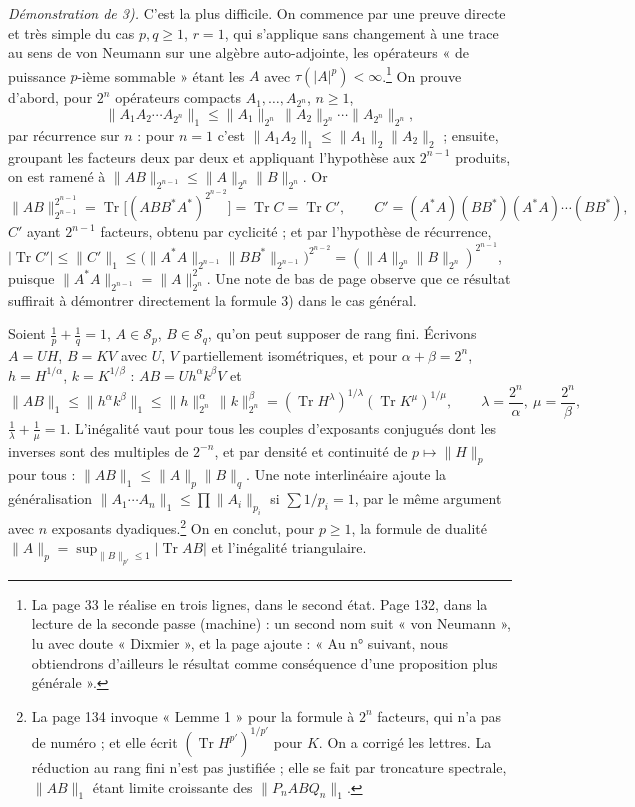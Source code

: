 \documentclass[11pt,a4paper]{article}
\begin{document}
\emph{Démonstration de 3).} C'est la plus difficile. On commence par une
preuve directe et très simple du cas $p, q \geq 1$, $r = 1$, qui
s'applique sans changement à une trace au sens de von Neumann sur une
algèbre auto-adjointe, les opérateurs « de puissance $p$-ième sommable »
étant les $A$ avec $\tau(|A|^p) < \infty$.\footnote{La page 33 le
réalise en trois lignes, dans le second état. Page 132, dans la lecture de
la seconde passe (machine) : un second nom suit « von Neumann », lu avec
doute « Dixmier », et la page ajoute : « Au n° suivant, nous obtiendrons
d'ailleurs le résultat comme conséquence d'une proposition plus
générale ».} On prouve d'abord, pour
$2^n$ opérateurs compacts $A_1, \ldots, A_{2^n}$, $n \geq 1$,
\[
  \|A_1 A_2 \cdots A_{2^n}\|_1 \leq \|A_1\|_{2^n}\,\|A_2\|_{2^n} \cdots \|A_{2^n}\|_{2^n},
\]
par récurrence sur $n$ : pour $n = 1$ c'est $\|A_1A_2\|_1 \leq
\|A_1\|_2\|A_2\|_2$ ; ensuite, groupant les facteurs deux par deux et
appliquant l'hypothèse aux $2^{n-1}$ produits, on est ramené à $\|AB\|_{2^{n-1}}
\leq \|A\|_{2^n}\|B\|_{2^n}$. Or
\[
  \|AB\|_{2^{n-1}}^{2^{n-1}} = \operatorname{Tr}\bigl[(ABB^{*}A^{*})^{2^{n-2}}\bigr]
  = \operatorname{Tr} C = \operatorname{Tr} C', \qquad
  C' = (A^{*}A)(BB^{*})(A^{*}A)\cdots(BB^{*}),
\]
$C'$ ayant $2^{n-1}$ facteurs, obtenu par cyclicité ; et par l'hypothèse
de récurrence, $|\operatorname{Tr} C'| \leq \|C'\|_1 \leq \bigl(\|A^{*}A\|_{2^{n-1}}
\|BB^{*}\|_{2^{n-1}}\bigr)^{2^{n-2}} = (\|A\|_{2^n}\|B\|_{2^n})^{2^{n-1}}$,
puisque $\|A^{*}A\|_{2^{n-1}} = \|A\|_{2^n}^2$. Une note de bas de page
observe que ce résultat suffirait à démontrer directement la formule 3) dans
le cas général.

Soient $\frac1p + \frac1q = 1$, $A \in \mathcal{S}_p$, $B \in \mathcal{S}_q$,
qu'on peut supposer de rang fini. Écrivons $A = UH$, $B = KV$ avec $U$, $V$
partiellement isométriques, et pour $\alpha + \beta = 2^n$, $h = H^{1/\alpha}$,
$k = K^{1/\beta}$ : $AB = Uh^\alpha k^\beta V$ et
\[
  \|AB\|_1 \leq \|h^\alpha k^\beta\|_1 \leq \|h\|_{2^n}^\alpha\,\|k\|_{2^n}^\beta
  = (\operatorname{Tr} H^{\lambda})^{1/\lambda}(\operatorname{Tr} K^{\mu})^{1/\mu},
  \qquad \lambda = \frac{2^n}{\alpha},\ \mu = \frac{2^n}{\beta},
\]
$\frac1\lambda + \frac1\mu = 1$. L'inégalité vaut pour tous les couples
d'exposants conjugués dont les inverses sont des multiples de $2^{-n}$, et
par densité et continuité de $p \mapsto \|H\|_p$ pour tous : $\|AB\|_1 \leq
\|A\|_p\|B\|_q$. Une note interlinéaire ajoute la généralisation $\|A_1
\cdots A_n\|_1 \leq \prod \|A_i\|_{p_i}$ si $\sum 1/p_i = 1$, par le même
argument avec $n$ exposants dyadiques.\footnote{La page 134 invoque « Lemme
1 » pour la formule à $2^n$ facteurs, qui n'a pas de numéro ; et elle écrit
$(\operatorname{Tr} H^{p'})^{1/p'}$ pour $K$. On a corrigé les lettres. La
réduction au rang fini n'est pas justifiée ; elle se fait par troncature
spectrale, $\|AB\|_1$ étant limite croissante des $\|P_nAB Q_n\|_1$.} On en
conclut, pour $p \geq 1$, la formule de dualité $\|A\|_p = \sup_{\|B\|_{p'}
\leq 1} |\operatorname{Tr} AB|$ et l'inégalité triangulaire.
\end{document}
